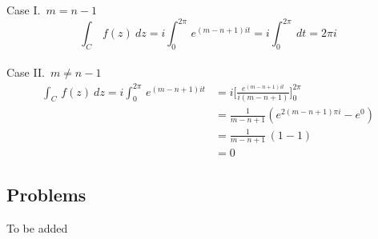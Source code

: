 \begin{example}
\begin{itemize}[itemsep=1.5em]
\vspace*{1em}
\noindent
Case I.\ $m = n-1$
\[\int_C\,f(z)\ dz = i\int_0^{2\pi}\,e^{(m - n + 1)it} = i\int_0^{2\pi}\ dt = 2\pi i\]\\
Case II.\ $m \neq n-1$
\begin{align*}
\int_C\,f(z)\ dz = i\int_0^{2\pi}\,e^{(m - n + 1)it} &= i\Bigg[\frac{e^{(m - n + 1)it}}{i(m - n + 1)}\Bigg]_0^{2\pi}\\[0.5em]
 &= \frac{1}{m - n + 1}\left(e^{2(m - n + 1)\pi i} - e^0\right)\\[0.5em]
 &= \frac{1}{m - n + 1}\,(1 - 1)\\[1em]
 &= 0
\end{align*}
%
\end{itemize}
\end{example}

\vspace*{2em}

\subsection{Problems}
\vspace{0.1in}
To be added
%
